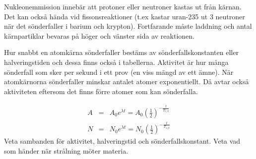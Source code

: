 \documentclass[10pt, titlepage, oneside, a4paper]{article}
\begin{document}
    Nukleonemmission innebär att protoner eller neutroner kastas ut från kärnan. Det kan också hända vid fissonsreaktioner
    (t.ex kastar uran-235 ut 3 neutroner när det sönderfaller i barium och krypton). Fortfarande måste laddning och antal
    kärnpartiklar bevaras på höger och vänster sida av reaktionen.

    Hur snabbt en atomkärna sönderfaller bestäms av sönderfallskonstanten eller halveringstiden och dessa finns också i tabellerna.
    Aktivitet är hur många sönderfall som sker per sekund i ett prov (en viss mängd av ett ämne). När atomkärnorna sönderfaller
    minskar antalet atomer exponentiellt. Då avtar också aktiviteten eftersom det finns förre atomer som kan sönderfalla.

    \begin{eqnarray}
        A &=& A_0 e^{\lambda t} = A_0 \left(\frac{1}{2}\right) ^{-\frac{t}{T_{1/2}}} \\
        N &=& N_0 e^{\lambda t} = N_0 \left(\frac{1}{2}\right)^{-\frac{t}{T_{1/2}}}
    \end{eqnarray}
    Veta sambanden för aktivitet, halveringstid och
    sönderfallskonstant.
    Veta vad som händer när strålning möter materia.
\end{document}
